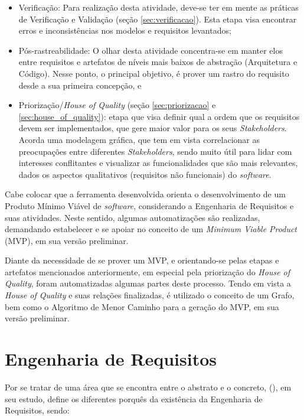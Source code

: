 \begin{itemize}
    \item Verificação: Para realização desta atividade, deve-se ter em mente as práticas de Verificação e Validação (seção \ref{sec:verificacao}). Esta etapa visa encontrar erros e inconsistências nos modelos e requisitos levantados;
    
    \item Pós-rastreabilidade: O olhar desta atividade concentra-se em manter elos entre requisitos e artefatos de níveis mais baixos de abstração (Arquitetura e Código). Nesse ponto, o principal objetivo, é prover um rastro do requisito desde a sua primeira concepção, e
    
    \item Priorização/\textit{House of Quality} (seção \ref{sec:priorizacao} e \ref{sec:house_of_quality}): etapa que visa definir qual a ordem que os requisitos devem ser implementados, que gere maior valor para os seus \textit{Stakeholders}. Acorda uma modelagem gráfica, que tem em vista correlacionar as preocupações entre diferentes \textit{Stakeholders}, sendo muito útil para lidar com interesses conflitantes e visualizar as funcionalidades que são mais relevantes, dados os aspectos qualitativos (requisitos não funcionais) do \textit{software}.
    
\end{itemize}

Cabe colocar que a ferramenta desenvolvida orienta o desenvolvimento de um Produto Mínimo Viável de \textit{software}, considerando a Engenharia de Requisitos e suas atividades. Neste sentido, algumas automatizações são realizadas, demandando estabelecer e se apoiar no conceito de um \textit{Minimum Viable Product} (MVP), em sua versão preliminar.

Diante da necessidade de se prover um MVP, e orientando-se pelas etapas e artefatos mencionados anteriormente, em especial pela priorização do \textit{House of Quality}, foram automatizadas algumas partes deste processo. Tendo em vista a \textit{House of Quality} e suas relações finalizadas, é utilizado o conceito de um Grafo, bem como o Algoritmo de Menor Caminho para a geração do MVP, em sua versão preliminar.

\section{Engenharia de Requisitos}

\label{sec:eng_requisitos_ex}

Por se tratar de uma área que se encontra entre o abstrato e o concreto, (\citeyear{westfall_5w2h}), em seu estudo, define os diferentes porquês da existência da Engenharia de Requisitos, sendo:

